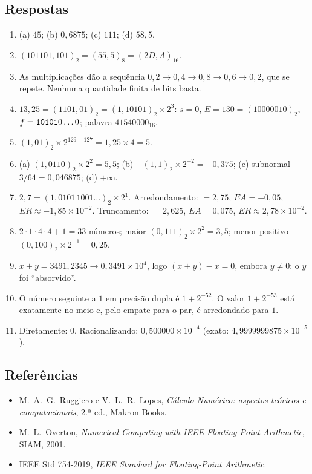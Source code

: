 \subsection*{Respostas}
\begin{enumerate}[label=\arabic*.,nosep]
  \item (a) $45$; (b) $0{,}6875$; (c) $111$; (d) $58{,}5$.
  \item $(101101{,}101)_2=(55{,}5)_8=(2D{,}A)_{16}$.
  \item As multiplicações dão a sequência $0{,}2\to0{,}4\to0{,}8\to0{,}6\to0{,}2$, que se repete. Nenhuma
        quantidade finita de bits basta.
  \item $13{,}25=(1101{,}01)_2=(1{,}10101)_2\times2^3$: $s=0$, $E=130=(10000010)_2$,
        $f=\texttt{10101}0\dots0$; palavra $41540000_{16}$.
  \item $(1{,}01)_2\times2^{129-127}=1{,}25\times4=5$.
  \item (a) $(1{,}0110)_2\times2^{2}=5{,}5$; (b) $-(1{,}1)_2\times2^{-2}=-0{,}375$; (c) subnormal
        $3/64=0{,}046875$; (d) $+\infty$.
  \item $2{,}7=(1{,}0101\,1001\dots)_2\times2^1$. Arredondamento: $=2{,}75$, $EA=-0{,}05$,
        $ER\approx-1{,}85\times10^{-2}$. Truncamento: $=2{,}625$, $EA=0{,}075$, $ER\approx2{,}78\times10^{-2}$.
  \item $2\cdot1\cdot4\cdot4+1=33$ números; maior $(0{,}111)_2\times2^2=3{,}5$; menor positivo $(0{,}100)_2\times2^{-1}=0{,}25$.
  \item $x+y=3491{,}2345\to0{,}3491\times10^{4}$, logo $(x+y)-x=0$, embora $y\neq0$: o $y$ foi ``absorvido''.
  \item O número seguinte a $1$ em precisão dupla é $1+2^{-52}$. O valor $1+2^{-53}$ está exatamente no meio e,
        pelo empate para o par, é arredondado para $1$.
  \item Diretamente: $0$. Racionalizando: $0{,}500000\times10^{-4}$ (exato: $4{,}9999999875\times10^{-5}$).
\end{enumerate}

\subsection*{Referências}
\begin{itemize}[nosep]
  \item M.~A.~G.~Ruggiero e V.~L.~R.~Lopes, \emph{Cálculo Numérico: aspectos teóricos e computacionais}, 2.ª ed., Makron Books.
  \item M.~L.~Overton, \emph{Numerical Computing with IEEE Floating Point Arithmetic}, SIAM, 2001.
  \item IEEE Std 754-2019, \emph{IEEE Standard for Floating-Point Arithmetic}.
\end{itemize}
